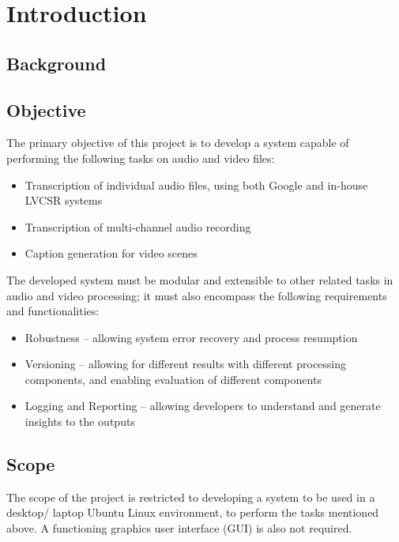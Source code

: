 \chapter{Introduction}

\section{Background}



\section{Objective}

The primary objective of this project is to develop a system capable of performing the following tasks on audio and video files:

\begin{itemize}
    \item Transcription of individual audio files, using both Google and in-house LVCSR systems
    \item Transcription of multi-channel audio recording
    \item Caption generation for video scenes
\end{itemize}

The developed system must be modular and extensible to other related tasks in audio and video processing; it must also encompass the following requirements and functionalities:

\begin{itemize}
    \item Robustness -- allowing system error recovery and process resumption
    \item Versioning -- allowing for different results with different processing components, and enabling evaluation of different components
    \item Logging and Reporting -- allowing developers to understand and generate insights to the outputs
\end{itemize}

\section{Scope}

The scope of the project is restricted to developing a system to be used in a desktop/ laptop Ubuntu Linux environment, to perform the tasks mentioned above. A functioning graphics user interface (GUI) is also not required.

